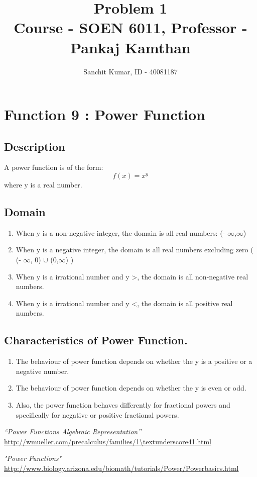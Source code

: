\documentclass[a4paper,12pt]{article}
\title{Problem 1\\
		\large Course - SOEN 6011, Professor - Pankaj Kamthan}
\author{Sanchit Kumar, ID - 40081187}
\begin{document}
\maketitle %

\section{\large Function 9 : Power Function}

\subsection{Description}
A power function is of the form:
\begin{equation} \label{Power_func}
	f(x) = x^y
\end{equation}
where y is a real number.


\subsection{Domain}
\begin{enumerate}
\item When y is a non-negative integer, the domain is all real numbers:  (- $\infty$,$\infty$)

\item When y is a negative integer, the domain is all real numbers excluding zero ( (- $\infty$, 0) $\cup$ (0,$\infty$) )

\item When y is a irrational number and y \textgreater {}, the domain is all non-negative real numbers.

\item When y is a irrational number and y \textless {}, the domain is all positive real numbers. 
\end{enumerate}


\subsection{Characteristics of Power Function.}
\begin{enumerate}
\item The behaviour of power function depends on whether the y is a positive or a negative number.
\item The behaviour of power function depends on whether the y is even or odd.
\item Also, the power function behaves differently for fractional powers and specifically for negative or positive fractional powers.
\end{enumerate}


\begin{thebibliography}{9}
	
	 \emph{“Power Functions Algebraic Representation”} \url{http://wmueller.com/precalculus/families/1\textunderscore41.html} 
	
	 \emph{"Power Functions"} \url{http://www.biology.arizona.edu/biomath/tutorials/Power/Powerbasics.html}
	
\end{thebibliography}
\end{document}
